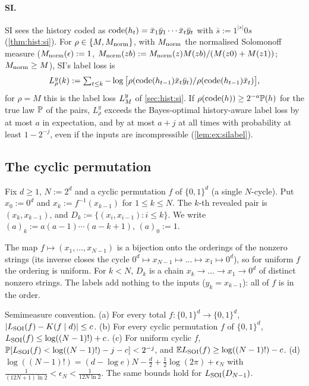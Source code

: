 \paragraph{SI.} SI sees the history coded as $\operatorname{code}(h_t)=\bar x_1\bar y_1\cdots\bar x_t\bar y_t$ with $\bar s:=1^{|s|}0s$ (\cref{thm:hist:si}). For $\rho\in\{M,M_{\mathrm{norm}}\}$, with $M_{\mathrm{norm}}$ the normalised Solomonoff measure ($M_{\mathrm{norm}}(\epsilon):=1$, $M_{\mathrm{norm}}(zb):=M_{\mathrm{norm}}(z)M(zb)/(M(z0)+M(z1))$; $M_{\mathrm{norm}}\ge M$), SI's label loss is
\[\textstyle L^y_\rho(k):=\sum_{t\le k}-\log\big[\rho(\operatorname{code}(h_{t-1})\bar x_t\bar y_t)/\rho(\operatorname{code}(h_{t-1})\bar x_t)\big],\]
for $\rho=M$ this is the label loss $L_{M}^{y}$ of \cref{sec:hist:si}. If $\rho(\operatorname{code}(h))\ge2^{-a}\mathbb{P}(h)$ for the true law $\mathbb{P}$ of the pairs, $L^y_\rho$ exceeds the Bayes-optimal history-aware label loss by at most $a$ in expectation, and by at most $a+j$ at all times with probability at least $1-2^{-j}$, even if the inputs are incompressible (\cref{lem:ex:silabel}).

\subsection{The cyclic permutation}\label{sec:ex:cyclic}

\begin{definition}\label{def:ex:cyclic}
Fix $d\ge1$, $N:=2^d$ and a cyclic permutation $f$ of $\{0,1\}^d$ (a single $N$-cycle). Put $x_0:=0^d$ and $x_k:=f^{-1}(x_{k-1})$ for $1\le k\le N$. The $k$-th revealed pair is $(x_k,x_{k-1})$, and $D_k:=\{(x_i,x_{i-1}):i\le k\}$. We write $(a)_k:=a(a-1)\cdots(a-k+1)$, $(a)_0:=1$.
\end{definition}

The map $f\mapsto(x_1,\dots,x_{N-1})$ is a bijection onto the orderings of the nonzero strings (its inverse closes the cycle $0^d\mapsto x_{N-1}\mapsto\dots\mapsto x_1\mapsto0^d$), so for uniform $f$ the ordering is uniform. For $k<N$, $D_k$ is a chain $x_k\to\dots\to x_1\to0^d$ of distinct nonzero strings. The labels add nothing to the inputs ($y_k=x_{k-1}$): all of $f$ is in the order.

\begin{theorem}\label{thm:ex:cycle}
Semimeasure convention.
(a) For every total $f:\{0,1\}^d\to\{0,1\}^d$, $|L_{\mathrm{SOI}}(f)-K(f\mid d)|\le c$.
(b) For every cyclic permutation $f$ of $\{0,1\}^d$, $L_{\mathrm{SOI}}(f)\le\log((N-1)!)+c$.
(c) For uniform cyclic $f$, $\mathbb{P}[L_{\mathrm{SOI}}(f)<\log((N-1)!)-j-c]<2^{-j}$, and $\mathbb{E}L_{\mathrm{SOI}}(f)\ge\log((N-1)!)-c$.
(d) $\log((N-1)!)=(d-\log e)N-\frac d2+\frac12\log(2\pi)+\epsilon_N$ with $\frac1{(12N+1)\ln2}<\epsilon_N<\frac1{12N\ln2}$.
The same bounds hold for $L_{\mathrm{SOI}}(D_{N-1})$.
\end{theorem}

